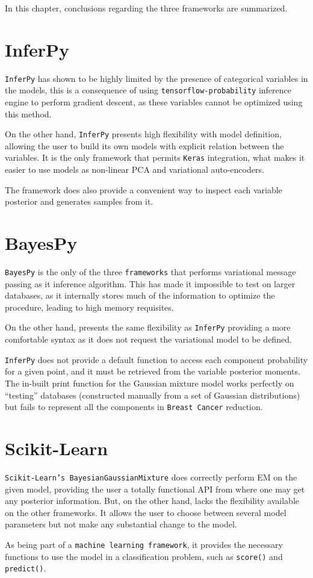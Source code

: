 
In this chapter, conclusions regarding the three frameworks are summarized.

\section{InferPy}
\texttt{InferPy} has shown to be highly limited by the presence of categorical variables in the models, this is a consequence of using \texttt{tensorflow-probability} inference engine to perform gradient descent, as these variables cannot be optimized using this method.

On the other hand, \texttt{InferPy} presents high flexibility with model definition, allowing the user to build its own models with explicit relation between the variables. It is the only framework that permits \texttt{Keras} integration, what makes it easier to use models as non-linear PCA and variational auto-encoders.

The framework does also provide a convenient way to inspect each variable posterior and generates samples from it.


\section{BayesPy}

\texttt{BayesPy} is the only of the three \texttt{frameworks} that performs variational message passing as it inference algorithm. This has made it impossible to test on larger databases, as it internally stores much of the information to optimize the procedure, leading to high memory requisites.

On the other hand, presents the same flexibility as \texttt{InferPy} providing a more comfortable syntax as it does not request the variational model to be defined.

\texttt{InferPy} does not provide a default function to access each component probability for a given point, and it must be retrieved from the variable posterior moments. The in-built print function for the Gaussian mixture model works perfectly on ``testing'' databases (constructed manually from a set of Gaussian distributions) but fails to represent all the components in \texttt{Breast Cancer} reduction.

\section{Scikit-Learn}

\texttt{Scikit-Learn's BayesianGaussianMixture} does correctly perform EM on the given model, providing the user a totally functional API from where one may get any posterior information. But, on the other hand, lacks the flexibility available on the other frameworks. It allows the user to choose between several model parameters but not make any substantial change to the model.

As being part of a \texttt{machine learning framework}, it provides the necessary functions to use the model in a classification problem, such as \texttt{score()} and \texttt{predict()}.
